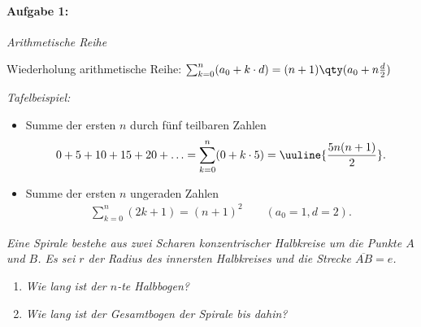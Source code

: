 
\paragraph{Aufgabe 1: } \emph{Arithmetische Reihe}

Wiederholung arithmetische Reihe: $\sum_{k=0}^n (a_0 + k \cdot d) = (n+1)\qty(a_0 + n \frac{d}{2})$ 

\emph{Tafelbeispiel:} 
\begin{itemize}
    \item Summe der ersten $n$ durch fünf teilbaren Zahlen 
    \begin{align}
        0 + 5 + 10 +15 + 20 + \hdots = \sum_{k=0}^n (0+k \cdot 5) = \uuline{\frac{5n(n+1)}{2}}.
    \end{align}
    \item Summe der ersten $n$ ungeraden Zahlen 
    \begin{align}
        \sum_{k=0}^n (2k+1) = (n+1)^2 \qquad (a_0 = 1, d=2).
    \end{align}
\end{itemize}

\emph{Eine Spirale bestehe aus zwei Scharen konzentrischer Halbkreise um die Punkte $A$ und $B$. Es sei $r$ der Radius des innersten Halbkreises und die Strecke $\overline{AB}=e$.}
\begin{enumerate}[label=(\alph*)]\setlength{\itemsep}{-0.5ex}
\item \emph{Wie lang ist der $n$-te Halbbogen?}
\item \emph{Wie lang ist der Gesamtbogen der Spirale bis dahin?}
\end{enumerate}
\begin{figure}[htp]
    \centering
    \vspace{-1.5cm}
\end{figure}

